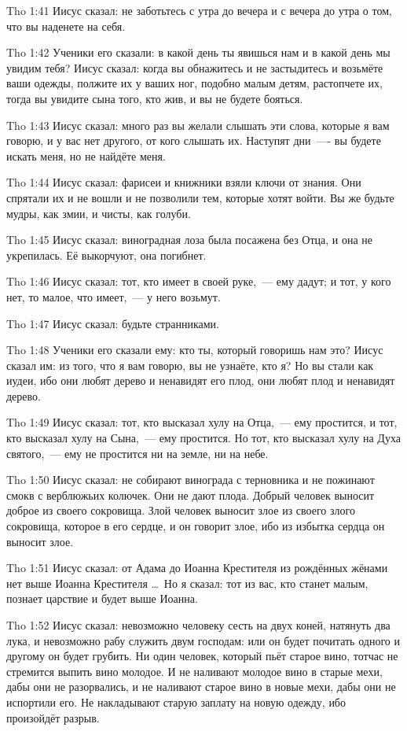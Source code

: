 \vs Tho 1:41
Иисус сказал:
не заботьтесь с утра до вечера и с вечера до утра о том,
что вы наденете на себя.

\vs Tho 1:42
Ученики его сказали:
в какой день ты явишься нам и в какой день мы увидим тебя?
Иисус сказал:
когда вы обнажитесь и не застыдитесь и возьмёте ваши одежды,
полжите их у ваших ног, подобно малым детям,
растопчете их, тогда вы увидите сына того, кто жив,
и вы не будете бояться.

\vs Tho 1:43
Иисус сказал:
много раз вы желали слышать эти слова, которые я вам говорю,
и у вас нет другого, от кого слышать их.
Наступят дни~---- вы будете искать меня, но не найдёте меня.

\vs Tho 1:44
Иисус сказал:
фарисеи и книжники взяли ключи от знания.
Они спрятали их и не вошли и не позволили тем,
которые хотят войти.
Вы же будьте мудры, как змии, и чисты, как голуби.

\vs Tho 1:45
Иисус сказал:
виноградная лоза была посажена без Отца, и она не укрепилась.
Её выкорчуют, она погибнет.

\vs Tho 1:46
Иисус сказал:
тот, кто имеет в своей руке,~--- ему дадут;
и тот, у кого нет, то малое, что имеет,~--- у него возьмут.

\vs Tho 1:47
Иисус сказал: будьте странниками.

\vs Tho 1:48
Ученики его сказали ему:
кто ты, который говоришь нам это?
Иисус сказал им:
из того, что я вам говорю, вы не узнаёте, кто я?
Но вы стали как иудеи,
ибо они любят дерево и ненавидят его плод,
они любят плод и ненавидят дерево.

\vs Tho 1:49
Иисус сказал:
тот, кто высказал хулу на Отца,~--- ему простится,
и тот, кто высказал хулу на Сына,~--- ему простится.
Но тот, кто высказал хулу на Духа святого,~--- ему
не простится ни на земле, ни на небе.

\vs Tho 1:50
Иисус сказал:
не собирают винограда с терновника
и не пожинают смокв с верблюжьих колючек.
Они не дают плода.
Добрый человек выносит доброе из своего сокровища.
Злой человек выносит злое из своего злого сокровища,
которое в его сердце, и он говорит злое,
ибо из избытка сердца он выносит злое.

\vs Tho 1:51
Иисус сказал:
от Адама до Иоанна Крестителя из рождённых жёнами
нет выше Иоанна Крестителя \ldots\ Но я сказал:
тот из вас, кто станет малым, познает царствие и будет выше Иоанна.

\vs Tho 1:52
Иисус сказал:
невозможно человеку сесть на двух коней,
натянуть два лука,
и невозможно рабу служить двум господам:
или он будет почитать одного и другому он будет грубить.
Ни один человек, который пьёт старое вино,
тотчас не стремится выпить вино молодое.
И не наливают молодое вино в старые мехи,
дабы они не разорвались,
и не наливают старое вино в новые мехи,
дабы они не испортили его.
Не накладывают старую заплату на новую одежду,
ибо произойдёт разрыв.

